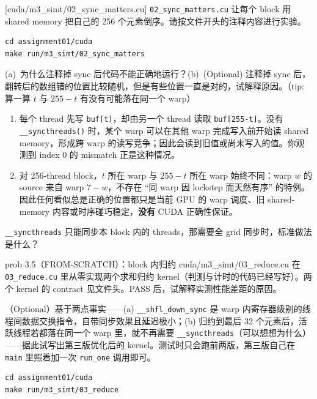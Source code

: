\documentclass[11pt,a4paper,fontset=none]{ctexart}
\begin{document}
[cuda/m3\_simt/02\_sync\_matters.cu]
\texttt{02\_sync\_matters.cu} 让每个 block 用 shared memory 把自己的 256 个元素倒序。请按文件开头的注释内容进行实验。

\begin{lstlisting}
cd assignment01/cuda
make run/m3_simt/02_sync_matters
\end{lstlisting}

(a)~为什么注释掉 sync 后代码不能正确地运行？(b)~(Optional) 注释掉 sync 后，翻转后的数组错的位置比较随机，但是有些位置一直是对的，试解释原因。（tip: 算一算 $t$ 与 $255-t$ 有没有可能落在同一个 warp）

\begin{answer}
\begin{enumerate}[label=(\alph*)]
  \item 每个 thread 先写 \texttt{buf[t]}，却由另一个 thread 读取 \texttt{buf[255-t]}。没有 \texttt{\_\_syncthreads()} 时，某个 warp 可以在其他 warp 完成写入前开始读 shared memory，形成跨 warp 的读写竞争；因此会读到旧值或尚未写入的值。你观测到 index 0 的 mismatch 正是这种情况。
  \item 对 256-thread block，$t$ 所在 warp 与 $255-t$ 所在 warp 始终不同：warp $w$ 的 source 来自 warp $7-w$，不存在 ``同 warp 因 lockstep 而天然有序'' 的特例。因此任何看似总是正确的位置都只是当前 GPU 的 warp 调度、旧 shared-memory 内容或时序碰巧稳定，\textbf{没有} CUDA 正确性保证。
\end{enumerate}
\end{answer}

\texttt{\_\_syncthreads} 只能同步本 block 内的 threads，那需要全 grid 同步时，标准做法是什么？

\begin{capstone}{prob 3.5（FROM-SCRATCH）：block 内归约 \hfill {\footnotesize\ttfamily cuda/m3\_simt/03\_reduce.cu}}
在 \texttt{03\_reduce.cu} 里从零实现两个求和归约 kernel（判测与计时的代码已经写好）。两个 kernel 的 contract 见文件头。PASS 后，试解释实测性能差距的原因。

（Optional）基于两点事实——(a) \texttt{\_\_shfl\_down\_sync} 是 warp 内寄存器级别的线程间数据交换指令，自带同步效果且延迟极小；(b) 归约到最后 32 个元素后，活跃线程若都落在同一个 warp 里，就不再需要 \texttt{\_\_syncthreads}（可以想想为什么）——据此试写出第三版优化后的 kernel。测试时只会跑前两版，第三版自己在 \texttt{main} 里照着加一次 \texttt{run\_one} 调用即可。
\end{capstone}

\begin{lstlisting}
cd assignment01/cuda
make run/m3_simt/03_reduce
\end{lstlisting}
\end{document}
